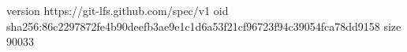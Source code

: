 version https://git-lfs.github.com/spec/v1
oid sha256:86c2297872fe4b90deefb3ae9e1c1d6a53f21cf96723f94c39054fca78dd9158
size 90033
